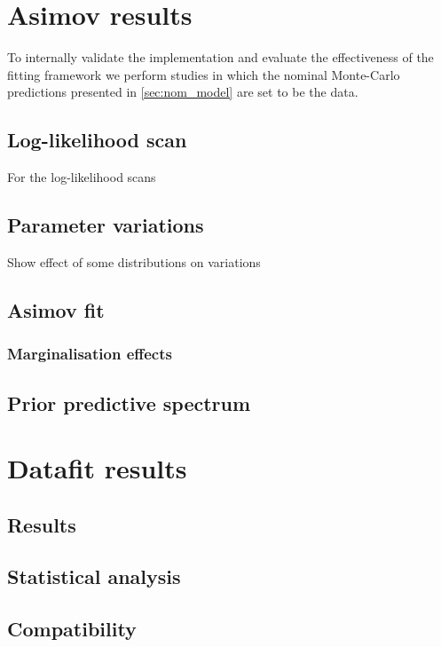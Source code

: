 \section{Asimov results}
To internally validate the implementation and evaluate the effectiveness of the fitting framework we perform studies in which the nominal Monte-Carlo predictions presented in \autoref{sec:nom_model} are set to be the data.

\subsection{Log-likelihood scan}
For the log-likelihood scans

\subsection{Parameter variations}
Show effect of some distributions on variations

\subsection{Asimov fit}

\subsubsection{Marginalisation effects}

\subsection{Prior predictive spectrum}


\section{Datafit results}

\subsection{Results}

\subsection{Statistical analysis}

\subsection{Compatibility}

